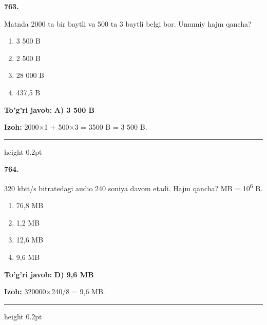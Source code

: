 \documentclass[10pt,a4paper,oneside]{article}
\begin{document}
\noindent\textbf{\color{ink}763.}
\par
Matnda 2000 ta bir baytli va 500 ta 3 baytli belgi bor. Umumiy hajm qancha?
\begin{enumerate}[label=\Alph*),leftmargin=9mm]
\item 3 500 B
\item 2 500 B
\item 28 000 B
\item 437,5 B
\end{enumerate}
\begin{tcolorbox}[enhanced,breakable,colback=teal!4,colframe=teal!50!black,boxrule=0.5pt,arc=1.1mm,left=3mm,right=3mm,top=1.7mm,bottom=1.7mm,before skip=2mm,after skip=2mm]
\textbf{\color{teal}To'g'ri javob:} \textbf{A) 3 500 B}
\par\smallskip
\textbf{Izoh:} 2000\ensuremath{\times}1 + 500\ensuremath{\times}3 = 3500 B = 3 500 B.
\end{tcolorbox}
\vspace{2mm}\hrule height 0.2pt \vspace{3mm}

\noindent\textbf{\color{ink}764.}
\par
320 kbit/s bitratedagi audio 240 soniya davom etadi. Hajm qancha? MB = 10\textsuperscript{6} B.
\begin{enumerate}[label=\Alph*),leftmargin=9mm]
\item 76,8 MB
\item 1,2 MB
\item 12,6 MB
\item 9,6 MB
\end{enumerate}
\begin{tcolorbox}[enhanced,breakable,colback=teal!4,colframe=teal!50!black,boxrule=0.5pt,arc=1.1mm,left=3mm,right=3mm,top=1.7mm,bottom=1.7mm,before skip=2mm,after skip=2mm]
\textbf{\color{teal}To'g'ri javob:} \textbf{D) 9,6 MB}
\par\smallskip
\textbf{Izoh:} 320000\ensuremath{\times}240/8 = 9,6 MB.
\end{tcolorbox}
\vspace{2mm}\hrule height 0.2pt \vspace{3mm}
\end{document}

